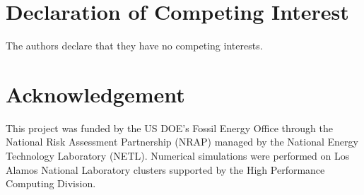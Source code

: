 \documentclass[10pt, twoside]{article}
\begin{document}
\section*{\textbf{Declaration of Competing Interest}}
The authors declare that they have no competing interests. 

\section*{\textbf{Acknowledgement}}
This project was funded by the US DOE’s Fossil Energy Office through the National Risk Assessment Partnership (NRAP) managed by the National Energy Technology Laboratory (NETL). Numerical simulations were performed on Los Alamos National Laboratory clusters supported by the High Performance Computing Division.



\end{document}
